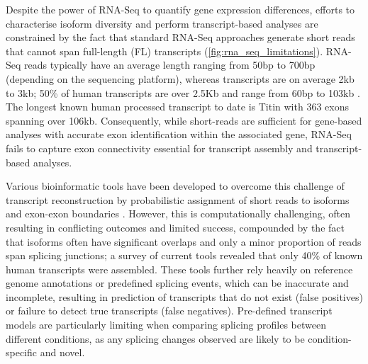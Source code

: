 Despite the power of RNA-Seq to quantify gene expression differences, efforts to characterise isoform diversity and perform transcript-based analyses are constrained by the fact that standard RNA-Seq approaches generate short reads that cannot span full-length (FL) transcripts (\cref{fig:rna_seq_limitations}). RNA-Seq reads typically have an average length ranging from 50bp to 700bp (depending on the sequencing platform), whereas transcripts are on average 2kb to 3kb; 50\% of human transcripts are over 2.5Kb\cite{Sharon2013} and range from 60bp to 103kb \cite{Piovesan2016,Sharon2013}. The longest known human processed transcript to date is Titin with 363 exons spanning over 106kb\cite{Bang2001}. Consequently, while short-reads are sufficient for gene-based analyses with accurate exon identification within the associated gene, RNA-Seq fails to capture exon connectivity essential for transcript assembly and transcript-based analyses\cite{Gordon2015, Wang2016}. 

Various bioinformatic tools have been developed to overcome this challenge of transcript reconstruction by probabilistic assignment of short reads to isoforms and exon-exon boundaries \cite{Trapnell2010, Kingsford2010, Au2013}. However, this is computationally challenging, often resulting in conflicting outcomes and limited success\cite{Steijger2013}, compounded by the fact that isoforms often have significant overlaps and only a minor proportion of reads span splicing junctions; a survey of current tools revealed that only 40\% of known human transcripts were assembled\cite{Steijger2013}. These tools further rely heavily on reference genome annotations or predefined splicing events, which can be inaccurate and incomplete, resulting in prediction of transcripts that do not exist (false positives) or failure to detect true transcripts (false negatives)\cite{Au2013}. Pre-defined transcript models are particularly limiting when comparing splicing profiles between different conditions, as any splicing changes observed are likely to be condition-specific and novel. 

